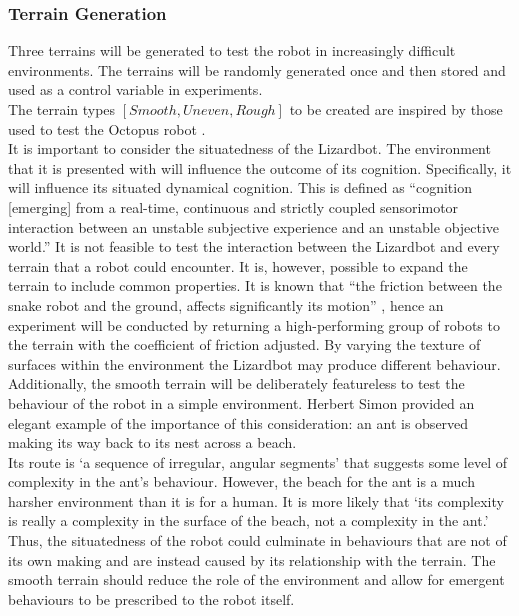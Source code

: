 \documentclass{article}
\begin{document}
\subsubsection{Terrain Generation}
\label{sec:Terrain Generation}
Three terrains will be generated to test the robot in increasingly difficult environments. The terrains will be randomly generated once and then stored and used as a control variable in experiments.\\ 
The terrain types $[Smooth, Uneven, Rough]$ to be created are inspired by those used to test the Octopus robot .\\

It is important to consider the situatedness of the Lizardbot. The environment that it is presented with will influence the outcome of its cognition. Specifically, it will influence its situated dynamical cognition. This is defined as “cognition [emerging] from a real-time, continuous and strictly coupled sensorimotor interaction between an unstable subjective experience and an unstable objective world.” 
It is not feasible to test the interaction between the Lizardbot and every terrain that a robot could encounter. It is, however, possible to expand the terrain to include common properties. It is known that “the friction between the snake robot and the ground, affects significantly its motion” , hence an experiment will be conducted by returning a high-performing group of robots to the terrain with the coefficient of friction adjusted. By varying the texture of surfaces within the environment the Lizardbot may produce different behaviour. \\

Additionally, the smooth terrain will be deliberately featureless to test the behaviour of the robot in a simple environment. Herbert Simon provided an elegant example of the importance of this consideration: an ant is observed making its way back to its nest across a beach.\\
Its route is ‘a sequence of irregular, angular segments’ that suggests some level of complexity in the ant's behaviour. However, the beach for the ant is a much harsher environment than it is for a human. It is more likely that ‘its complexity is really a complexity in the surface of the beach, not a complexity in the ant.’  Thus, the situatedness of the robot could culminate in behaviours that are not of its own making and are instead caused by its relationship with the terrain. The smooth terrain should reduce the role of the environment and allow for emergent behaviours to be prescribed to the robot itself.\\
\end{document}

